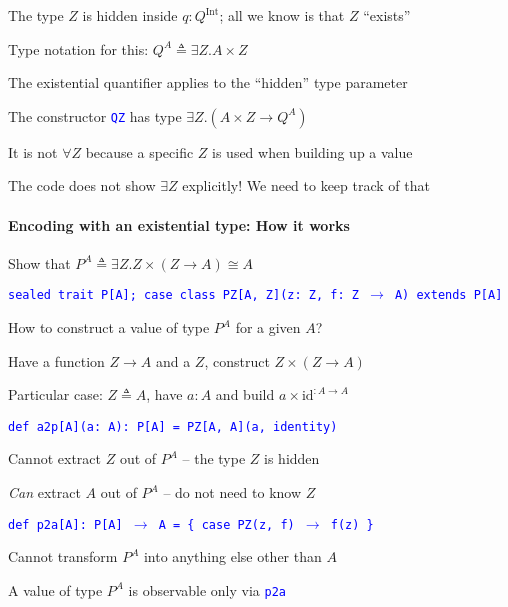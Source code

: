 The type $Z$ is hidden inside $q:Q^{\text{Int}}$; all we know is
that $Z$ \textsf{``}exists\textsf{''}

Type notation for this: $Q^{A}\triangleq\exists Z.A\times Z$

The existential quantifier applies to the \textsf{``}hidden\textsf{''} type parameter

The constructor \texttt{\textcolor{blue}{\footnotesize{}QZ}} has type
$\exists Z.\left(A\times Z\rightarrow Q^{A}\right)$

It is not $\forall Z$ because a specific $Z$ is used when building
up a value

The code does not show $\exists Z$ explicitly! We need to keep track
of that


\paragraph{Encoding with an existential type: How it works}

Show that $P^{A}\triangleq\exists Z.Z\times\left(Z\rightarrow A\right)\cong A$

\texttt{\textcolor{blue}{\footnotesize{}sealed trait P{[}A{]}; case
class PZ{[}A, Z{]}(z: Z, f: Z $\rightarrow$ A) extends P{[}A{]}}}{\footnotesize\par}

How to construct a value of type $P^{A}$ for a given $A$?

Have a function $Z\rightarrow A$ and a $Z$, construct $Z\times\left(Z\rightarrow A\right)$

Particular case: $Z\triangleq A$, have $a:A$ and build $a\times\text{id}^{:A\rightarrow A}$

\texttt{\textcolor{blue}{\footnotesize{}def a2p{[}A{]}(a: A): P{[}A{]}
= PZ{[}A, A{]}(a, identity)}}{\footnotesize\par}

Cannot extract $Z$ out of $P^{A}$ – the type $Z$ is hidden

\emph{Can} extract $A$ out of $P^{A}$ – do not need to know $Z$

\texttt{\textcolor{blue}{\footnotesize{}def p2a{[}A{]}: P{[}A{]} $\rightarrow$
A = \{ case PZ(z, f) $\rightarrow$ f(z) \}}}{\footnotesize\par}

Cannot transform $P^{A}$ into anything else other than $A$

A value of type $P^{A}$ is observable only via \texttt{\textcolor{blue}{\footnotesize{}p2a}} 

